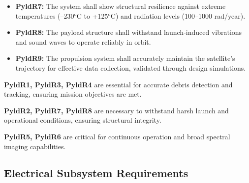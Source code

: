 \begin{itemize}
    \item \textbf{PyldR7:} The system shall show structural resilience against extreme temperatures (–230°C to +125°C) and radiation levels (100–1000 rad/year).
    \item \textbf{PyldR8:} The payload structure shall withstand launch-induced vibrations and sound waves to operate reliably in orbit.
    \item \textbf{PyldR9:} The propulsion system shall accurately maintain the satellite's trajectory for effective data collection, validated through design simulations.
\end{itemize}

\textbf{PyldR1, PyldR3, PyldR4} are essential for accurate debris detection and tracking, ensuring mission objectives are met.

\textbf{PyldR2, PyldR7, PyldR8} are necessary to withstand harsh launch and operational conditions, ensuring structural integrity.

\textbf{PyldR5, PyldR6} are critical for continuous operation and broad spectral imaging capabilities.

\subsection{Electrical Subsystem Requirements}

